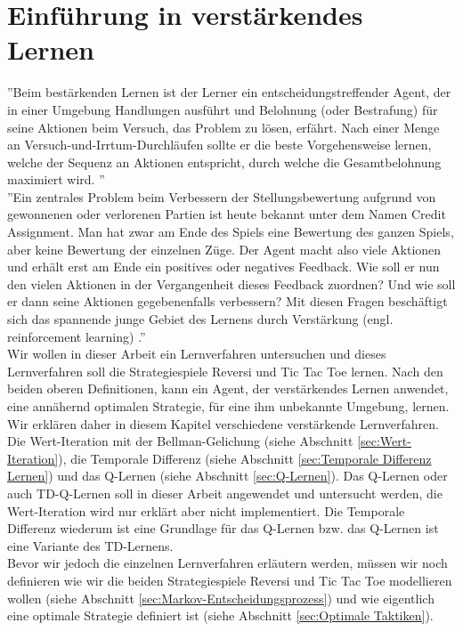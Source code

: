 \chapter{Einführung in verstärkendes Lernen}
\label{cha:Einführung in verstärkendes Lernen}
''Beim bestärkenden Lernen ist der Lerner ein entscheidungstreffender Agent, der in einer Umgebung Handlungen ausführt und Belohnung (oder Bestrafung) für seine Aktionen beim Versuch, das Problem zu lösen, erfährt. Nach einer Menge an Versuch-und-Irrtum-Durchläufen sollte er die beste Vorgehensweise lernen, welche der Sequenz an Aktionen entspricht, durch welche die Gesamtbelohnung maximiert wird. \cite[397]{Alpaydin}'' \\

''Ein zentrales Problem beim Verbessern der Stellungsbewertung aufgrund von gewonnenen oder verlorenen Partien ist heute bekannt unter dem Namen Credit Assignment. Man hat zwar am Ende des Spiels eine Bewertung des ganzen Spiels, aber keine Bewertung der einzelnen Züge. Der Agent macht also viele Aktionen und erhält erst am Ende ein positives oder negatives Feedback. Wie soll er nun den vielen Aktionen in der Vergangenheit dieses Feedback zuordnen? Und wie soll er dann seine Aktionen gegebenenfalls verbessern? Mit diesen Fragen beschäftigt sich das spannende junge Gebiet des Lernens durch Verstärkung (engl. reinforcement learning) \cite[120]{Ertel}.'' \\

Wir wollen in dieser Arbeit ein Lernverfahren untersuchen und dieses Lernverfahren soll die Strategiespiele Reversi und Tic Tac Toe lernen. Nach den beiden oberen Definitionen, kann ein Agent, der verstärkendes Lernen anwendet, eine annähernd optimalen Strategie, für eine ihm unbekannte Umgebung, lernen. Wir erklären daher in diesem Kapitel verschiedene verstärkende Lernverfahren. Die Wert-Iteration mit der Bellman-Gelichung (siehe Abschnitt \ref{sec:Wert-Iteration}), die Temporale Differenz (siehe Abschnitt \ref{sec:Temporale Differenz Lernen}) und das Q-Lernen (siehe Abschnitt \ref{sec:Q-Lernen}). Das Q-Lernen oder auch TD-Q-Lernen soll in dieser Arbeit angewendet und untersucht werden, die Wert-Iteration wird nur erklärt aber nicht implementiert. Die Temporale Differenz wiederum ist eine Grundlage für das Q-Lernen bzw. das Q-Lernen ist eine Variante des TD-Lernens. \\

Bevor wir jedoch die einzelnen Lernverfahren erläutern werden, müssen wir noch definieren wie wir die beiden Strategiespiele Reversi und Tic Tac Toe modellieren wollen (siehe Abschnitt \ref{sec:Markov-Entscheidungsprozess}) und wie eigentlich eine optimale Strategie definiert ist (siehe Abschnitt \ref{sec:Optimale Taktiken}).\\

